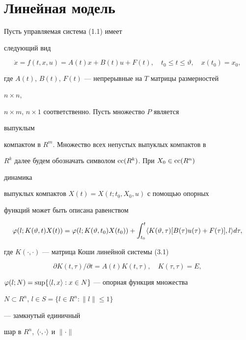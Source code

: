  


\section{Линейная модель} 


 


Пусть управляемая система (1.1) имеет 


следующий вид 


\begin{equation} 


\Dot x=f(t,x,u)=A(t)x+B(t)u+F(t),\quad 


t_0\le t\le\vartheta,\quad x(t_0)=x_0, 


\end{equation} 


где $A(t)$, $B(t)$, $F(t)$ --- непрерывные на $T$ матрицы размерностей 


$n\times n$, 


$n\times m$, $n\times 1$ соответственно. Пусть множество $P$ является 


выпуклым 


компактом в $R^m$. Множество всех непустых выпуклых компактов в 


$R^k$ далее будем обозначать символом $\operatorname{cc}(R^k)$. При $X_0\in\operatorname{cc}(R^n)$ 


динамика 


выпуклых компактов $X(t)=X(t;t_0,X_0,u)$ с помощью опорных 


функций может быть описана равенством 


$$ 


\varphi(l;K(\vartheta,t)X(t))=\varphi(l;K(\vartheta,t_0)X(t_0))+ 


\int^t_{t_0}\la K(\vartheta,\tau)[B(\tau)u(\tau)+F(\tau)],l\ra d\tau, 


$$ 


где $K(\cdot,\cdot)$ --- матрица Коши линейной системы (3.1) 


$$ 


\partial K(t,\tau)/\partial t=A(t)K(t,\tau),\quad K(\tau,\tau)=E, 


$$ 


$\varphi(l;N)=\sup\{\langle l,x\rangle:x\in N\}$ --- опорная функция множества 


$N\subset R^n$, $l\in S=\{l\in R^n:\|l\|\le 1\}$ 


--- замкнутый единичный 


шар в $R^n$, $\langle\cdot,\cdot\rangle$ и $\|\cdot\|$ 


